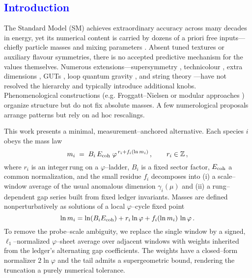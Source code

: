 \documentclass[%
 amsmath,amssymb,
 aps,
prb,
floatfix, showkeys
]{revtex4-2}
\newcommand{\modif}[1]{\textcolor{blue}{#1}}
\begin{document}
\modif{
  \section{ Introduction}
\label{sec-1}
}
The Standard Model (SM) \cite{SM-ref,weinberg-book,Weinberg1979} achieves extraordinary accuracy across many decades in energy, yet its numerical content is carried by dozens of a priori free inputs—chiefly particle masses and mixing parameters \cite{PDG2022,PDG2025}. Absent tuned textures or auxiliary flavour symmetries, there is no accepted predictive mechanism for the values themselves. Numerous extensions—supersymmetry \cite{dine-1993,Wess1974}, technicolour \cite{Susskind1979,hill-2003,technicolor-2015}, extra dimensions \cite{Randall1999}, GUTs \cite{grand-uni-th-2015}, loop quantum gravity \cite{Rovelli2004,loop-qg}, and string theory \cite{polchinski-1998}—have not resolved the hierarchy and typically introduce additional knobs. Phenomenological constructions (e.g. Froggatt–Nielsen \cite{frog-1979,fritz-2000} or modular approaches \cite{petcov}) organize structure but do not fix absolute masses. A few numerological proposals \cite{koide-1983,eln-2002,eln-2002-1,cascade-2003} arrange patterns but rely on ad hoc rescalings.
\par
This work presents a minimal, measurement–anchored alternative. Each species $i$ obeys the mass law
\begin{equation}
  m_i \;=\; B_i\,E_{\rm coh}\;\varphi^{\,r_i+f_i(\ln m_i)}\,,\qquad r_i\in\mathbb{Z}\,,
  \label{eq:mass_law_intro}
\end{equation}
where $r_i$ is an integer\,rung on a $\varphi$–ladder, $B_i$ is a fixed sector factor, $E_{\rm coh}$ a common normalization, and the small residue $f_i$ decomposes into (i) a scale–window average of the usual anomalous dimension $\gamma_i(\mu)$ and (ii) a rung–dependent gap series built from fixed ledger invariants. Masses are defined nonperturbatively as 
solutions of a local $\varphi$–cycle fixed point
\begin{equation}
  \ln m_i = \ln(B_iE_{\rm coh}) + r_i\ln\varphi + f_i(\ln m_i)\,\ln\varphi\,.
\end{equation}
To remove the probe–scale ambiguity, we replace the single window by a signed, $\ell_1$–normalized $\varphi$–sheet average over adjacent windows with weights inherited from the ledger's alternating gap coefficients. The weights have a closed–form normalizer $2\ln\varphi$ and the tail admits a supergeometric bound, rendering the truncation a purely numerical tolerance.
\par
\end{document}
